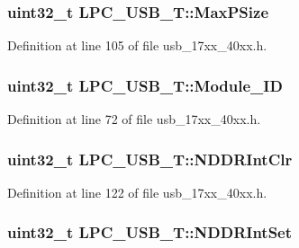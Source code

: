\subsubsection[{\texorpdfstring{Max\+P\+Size}{MaxPSize}}]{ uint32\+\_\+t L\+P\+C\+\_\+\+U\+S\+B\+\_\+\+T\+::\+Max\+P\+Size}\hypertarget{structLPC__USB__T_aa7b9523238521c44e98f80d26e3992ea}{}\label{structLPC__USB__T_aa7b9523238521c44e98f80d26e3992ea}


Definition at line 105 of file usb\+\_\+17xx\+\_\+40xx.\+h.

\subsubsection[{\texorpdfstring{Module\+\_\+\+ID}{Module_ID}}]{ uint32\+\_\+t L\+P\+C\+\_\+\+U\+S\+B\+\_\+\+T\+::\+Module\+\_\+\+ID}\hypertarget{structLPC__USB__T_a0cb48fd6b5b916dd404cfb1acc2e9e95}{}\label{structLPC__USB__T_a0cb48fd6b5b916dd404cfb1acc2e9e95}


Definition at line 72 of file usb\+\_\+17xx\+\_\+40xx.\+h.

\subsubsection[{\texorpdfstring{N\+D\+D\+R\+Int\+Clr}{NDDRIntClr}}]{ uint32\+\_\+t L\+P\+C\+\_\+\+U\+S\+B\+\_\+\+T\+::\+N\+D\+D\+R\+Int\+Clr}\hypertarget{structLPC__USB__T_a5d7ced93bcfade2997201bf6f8652163}{}\label{structLPC__USB__T_a5d7ced93bcfade2997201bf6f8652163}


Definition at line 122 of file usb\+\_\+17xx\+\_\+40xx.\+h.

\subsubsection[{\texorpdfstring{N\+D\+D\+R\+Int\+Set}{NDDRIntSet}}]{ uint32\+\_\+t L\+P\+C\+\_\+\+U\+S\+B\+\_\+\+T\+::\+N\+D\+D\+R\+Int\+Set}\hypertarget{structLPC__USB__T_af1c9974ab3c4d76a457f777ab688d58f}{}\label{structLPC__USB__T_af1c9974ab3c4d76a457f777ab688d58f}


